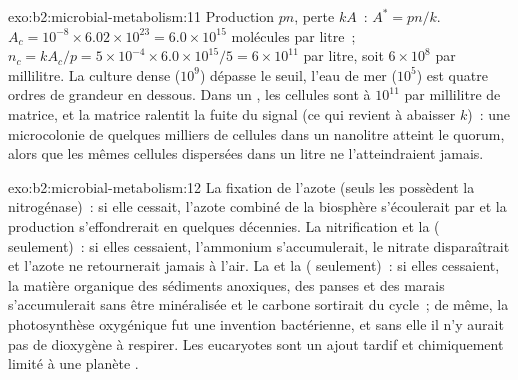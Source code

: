\begin{solution}{exo:b2:microbial-metabolism:11}
Production $pn$, perte $kA$~: $A^* = pn/k$. $A_c = 10^{-8}\times
6.02\times 10^{23} = 6.0\times 10^{15}$ molécules par litre~; $n_c =
kA_c/p = 5\times 10^{-4}\times 6.0\times 10^{15}/5 = 6\times 10^{11}$
par litre, soit $6\times 10^{8}$ par millilitre. La culture dense
($10^{9}$) dépasse le seuil, l'eau de mer ($10^{5}$) est quatre ordres
de grandeur en dessous. Dans un , les cellules sont à $10^{11}$
par millilitre de matrice, et la matrice ralentit la fuite du signal
(ce qui revient à abaisser $k$)~: une microcolonie de quelques milliers
de cellules dans un nanolitre atteint le quorum, alors que les mêmes
cellules dispersées dans un litre ne l'atteindraient jamais.
\end{solution}

\begin{solution}{exo:b2:microbial-metabolism:12}
La fixation de l'azote (seuls les  possèdent la
nitrogénase)~: si elle cessait, l'azote combiné de la biosphère
s'écoulerait par  et la production s'effondrerait en
quelques décennies. La nitrification et la  (
seulement)~: si elles cessaient, l'ammonium s'accumulerait, le nitrate
disparaîtrait et l'azote ne retournerait jamais à l'air. La
 et la  ( seulement)~: si
elles cessaient, la matière organique des sédiments anoxiques, des
panses et des marais s'accumulerait sans être minéralisée et le carbone
sortirait du cycle~; de même, la photosynthèse oxygénique fut une
invention bactérienne, et sans elle il n'y aurait pas de dioxygène à
respirer. Les eucaryotes sont un ajout tardif et chimiquement limité à
une planète .
\end{solution}

